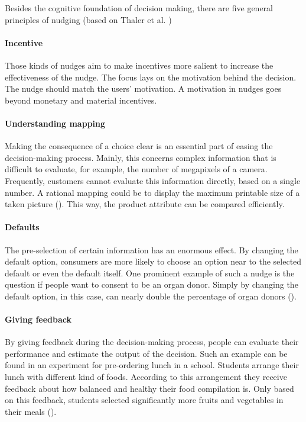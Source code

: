 Besides the cognitive foundation of decision making, there are five general principles of nudging (based on Thaler et al. \citeyear{thaler_choice_2010})
\paragraph{Incentive}
Those kinds of nudges aim to make incentives more salient to increase the effectiveness of the nudge. The focus lays on the motivation behind the decision. The nudge should match the users' motivation. A motivation in nudges goes beyond monetary and material incentives.
\paragraph{Understanding mapping}
Making the consequence of a choice clear is an essential part of easing the decision-making process. Mainly, this concerns complex information that is difficult to evaluate, for example, the number of megapixels of a camera. Frequently, customers cannot evaluate this information directly, based on a single number. A rational mapping could be to display the maximum printable size of a taken picture (\cite{weinmann_digital_2016}). This way, the product attribute can be compared efficiently.
\paragraph{Defaults}
The pre-selection of certain information has an enormous effect. By changing the default option, consumers are more likely to choose an option near to the selected default or even the default itself. One prominent example of such a nudge is the question if people want to consent to be an organ donor. Simply by changing the default option, in this case, can nearly double the percentage of organ donors (\cite{johnson_defaults_2003}). 
\paragraph{Giving feedback}
By giving feedback during the decision-making process, people can evaluate their performance and estimate the output of the decision. Such an example can be found in an experiment for pre-ordering lunch in a school. Students arrange their lunch with different kind of foods. According to this arrangement they receive feedback about how balanced and healthy their food compilation is. Only based on this feedback, students selected significantly more fruits and vegetables in their meals (\cite{miller_effects_2016}).
